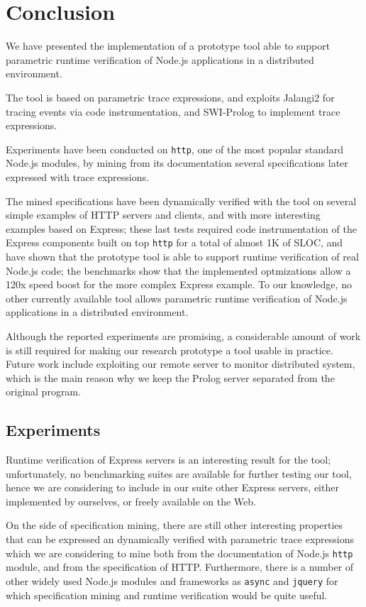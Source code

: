 \section{Conclusion}
\label{sec:conclu}

We have presented the implementation of a prototype tool able to support
parametric runtime verification of Node.js applications in a distributed environment.

The tool is based on parametric trace expressions, and exploits Jalangi2 for tracing events via code instrumentation, and SWI-Prolog to
implement trace expressions.

Experiments have been conducted on \lstinline{http}, one of the most popular standard Node.js modules,
by mining from its documentation several specifications later expressed with trace expressions.

The mined specifications have been dynamically verified with the tool on several simple examples of HTTP servers and clients,
and with more interesting examples based on Express; these last tests required code instrumentation of the Express components
built on top \lstinline{http} for a total of almost 1K of SLOC, and have shown that the prototype tool is able to support
runtime verification of real Node.js code; the benchmarks show that the implemented optmizations allow a 120x speed boost for the more
complex Express example.
To our knowledge, no other currently available tool allows parametric runtime verification of Node.js applications in a distributed environment.

Although the reported experiments are promising, a considerable amount of work is still required for making our research prototype a tool usable in practice.
Future work include exploiting our remote server to monitor distributed system, which is the main reason why we keep the Prolog server separated from the original program.

\subsection{Experiments}
Runtime verification of Express servers is an interesting result for the tool; unfortunately,
no benchmarking suites are available for further testing our tool, hence we are
considering to include in our suite other Express servers, either implemented by ourselves,
or freely available on the Web.

On the side of specification mining, there are still other interesting properties that can be expressed an dynamically
verified with parametric trace expressions which we are considering to mine both from the documentation of Node.js
\lstinline{http} module, and from the specification of HTTP. Furthermore, there is a number of other widely used Node.js
modules and frameworks as \lstinline{async} and \lstinline{jquery} for which specification mining and runtime
verification would be quite useful.

